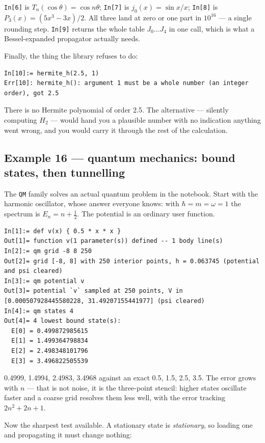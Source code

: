 \documentclass[11pt]{article}
\newcommand{\kw}[1]{\texttt{\uppercase{#1}}}
\newcommand{\code}[1]{\texttt{#1}}
\begin{document}
\code{In[6]} is $T_n(\cos\theta)=\cos n\theta$; \code{In[7]} is
$j_0(x)=\sin x/x$; \code{In[8]} is $P_3(x)=(5x^3-3x)/2$. All three land
at zero or one part in $10^{16}$ --- a single rounding step.
\code{In[9]} returns the whole table $J_0\ldots J_4$ in one call, which
is what a Bessel-expanded propagator actually needs.

Finally, the thing the library refuses to do:

\begin{lstlisting}
In[10]:= hermite_h(2.5, 1)
Err[10]: hermite_h(): argument 1 must be a whole number (an integer order), got 2.5
\end{lstlisting}

There is no Hermite polynomial of order 2.5. The alternative ---
silently computing $H_2$ --- would hand you a plausible number with no
indication anything went wrong, and you would carry it through the rest
of the calculation.

\subsection{Example 16 --- quantum mechanics: bound states, then tunnelling}

The \kw{qm} family solves an actual quantum problem in the notebook.
Start with the harmonic oscillator, whose answer everyone knows: with
$\hbar=m=\omega=1$ the spectrum is $E_n=n+\tfrac12$. The potential is an
ordinary user function.

\begin{lstlisting}
In[1]:= def v(x) { 0.5 * x * x }
Out[1]= function v(1 parameter(s)) defined -- 1 body line(s)
In[2]:= qm grid -8 8 250
Out[2]= grid [-8, 8] with 250 interior points, h = 0.063745 (potential and psi cleared)
In[3]:= qm potential v
Out[3]= potential `v` sampled at 250 points, V in [0.000507928445580228, 31.49207155441977] (psi cleared)
In[4]:= qm states 4
Out[4]= 4 lowest bound state(s):
  E[0] = 0.499872985615
  E[1] = 1.499364798834
  E[2] = 2.498348101796
  E[3] = 3.496822505539
\end{lstlisting}

0.4999, 1.4994, 2.4983, 3.4968 against an exact 0.5, 1.5, 2.5, 3.5. The
error grows with $n$ --- that is not noise, it is the three-point
stencil: higher states oscillate faster and a coarse grid resolves them
less well, with the error tracking $2n^2+2n+1$.

Now the sharpest test available. A stationary state is \emph{stationary},
so loading one and propagating it must change nothing:
\end{document}
